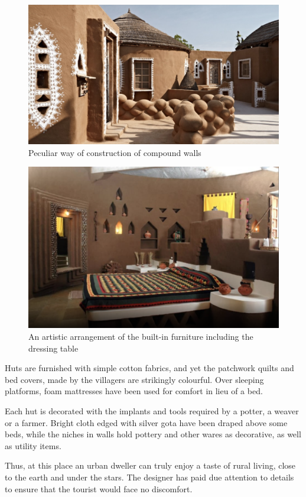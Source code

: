 \begin{figure}[H]
  \centering
  \includegraphics[angle=0,width=1.0\textwidth]{img/dc-06}
  \caption{Peculiar way of construction of compound walls}
  \label{fig:dc-06} 
\end{figure}
\begin{figure}[H]
  \centering
  \includegraphics[angle=0,width=1.0\textwidth]{img/dc-07}
  \caption{An artistic arrangement of the built-in furniture including the dressing table}
  \label{fig:dc-07} 
\end{figure}

\noindent Huts are furnished with simple cotton fabrics, and yet the patchwork quilts and bed covers, made by the villagers are strikingly colourful. Over sleeping platforms, foam mattresses have been used for comfort in lieu of a bed.

Each hut is decorated with the implants and tools required by a potter, a weaver or a farmer. Bright cloth edged with silver gota have been draped above some beds, while the niches in walls hold pottery and other wares as decorative, as well as utility items.

Thus, at this place an urban dweller can truly enjoy a taste of rural living, close to the earth and under the stars. The designer has paid due attention to details to ensure that the tourist would face no discomfort.


